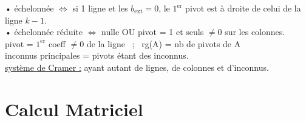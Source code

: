 \documentclass[12 pt]{book}
\begin{document}
\begin{flushleft}
\begin{doublespace}

	• échelonnée $\Leftrightarrow$ si 1 ligne et les $b_{\text{ext}} =0$, le $1^{\text{er}}$ pivot est à droite de celui de la ligne $k-1$.\\
	• échelonnée réduite $\Leftrightarrow$ nulle OU pivot = 1 et seuls $\ne 0$ sur les colonnes.\\
	pivot = $1^{\text{er}}$ coeff $\ne 0$ de la ligne \ ; \ rg(A) = nb de pivots de A \\
	 inconnus principales = pivots étant des inconnus.\\ 
	 \underline{système de Cramer :} ayant autant de lignes, de colonnes et d'inconnus.\\


\end{doublespace}
\end{flushleft}

\section*{Calcul Matriciel}
\end{document}
